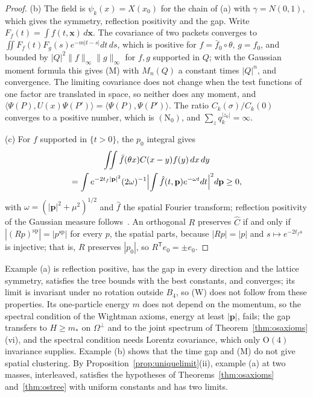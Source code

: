 \documentclass[aps,prd,twocolumn,superscriptaddress,nofootinbib,longbibliography,floatfix,amsmath,amssymb,10pt]{revtex4-2}
\theoremstyle{definition}
\theoremstyle{remark}
\newcommand{\ip}[2]{\langle #1,#2\rangle}
\begin{document}
\begin{proof}
(b) The field is $\psi_k(x)=X(x_0)$ for the chain of (a) with
$\gamma=N(0,1)$, which gives the symmetry, reflection positivity and the
gap. Write $F_f(t)=\int f(t,\mathbf x)\,d\mathbf x$. The covariance of two
packets converges to $\iint F_f(t)F_g(s)e^{-m|t-s|}dt\,ds$, which is
positive for $f=\bar f_0\circ\theta$, $g=f_0$, and bounded by
$|Q|^2\|f\|_\infty\|g\|_\infty$ for $f,g$ supported in $Q$; with the
Gaussian moment formula this gives (M) with $M_n(Q)$ a constant times
$|Q|^n$, and convergence. The limiting covariance does not change when the
test functions of one factor are translated in space, so neither does any
moment, and $\ip{\Psi(P)}{U(x)\Psi(P')}=\ip{\Psi(P)}{\Psi(P')}$. The ratio
$C_k(\sigma)/C_k(0)$ converges to a positive number, which is
$(\mathrm N_0)$, and $\sum_zq_k^{|z_0|}=\infty$.

(c) For $f$ supported in $\{t>0\}$, the $p_0$ integral gives
\begin{multline*}
\iint\bar f(\theta x)C(x-y)f(y)\,dx\,dy\\
=\int e^{-2t_f|\mathbf p|^2}
(2\omega)^{-1}\Bigl|\int\hat f(t,\mathbf p)e^{-\omega t}dt\Bigr|^2
d\mathbf p\ge0,
\end{multline*}
with $\omega=(|\mathbf p|^2+\mu^2)^{1/2}$ and $\hat f$ the spatial Fourier
transform; reflection positivity of the Gaussian measure
follows~\cite[Sect.~6.2]{GJ87}. An orthogonal $R$ preserves $\widehat C$ if
and only if $|(Rp)^{\mathrm{sp}}|=|p^{\mathrm{sp}}|$ for every $p$, the
spatial parts, because $|Rp|=|p|$ and $s\mapsto e^{-2t_fs}$ is injective;
that is, $R$ preserves $|p_0|$, so $R^{\mathsf T}e_0=\pm e_0$.
\end{proof}

Example (a) is reflection positive, has the gap in every direction and the
lattice symmetry, satisfies the tree bounds with the best constants, and
converges; its limit is invariant under no rotation outside $B_4$, so (W)
does not follow from these properties. Its one-particle energy $m$ does not
depend on the momentum, so the spectral condition of the Wightman axioms,
energy at least $|\mathbf p|$, fails; the gap transfers to
$H\ge m_*$ on $\Omega^\perp$ and to the joint spectrum of
Theorem~\ref{thm:osaxioms}(vi), and the spectral condition needs Lorentz
covariance, which only $\mathrm O(4)$ invariance supplies. Example (b)
shows that the time gap and (M) do not give spatial clustering. By
Proposition~\ref{prop:uniquelimit}(ii), example (a) at two masses,
interleaved, satisfies the hypotheses of Theorems~\ref{thm:osaxioms}
and~\ref{thm:ostree} with uniform constants and has two limits.
\end{document}

